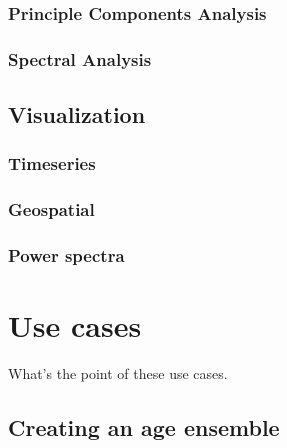 \documentclass[gc, manuscript]{copernicus}
\begin{document}
\subsubsection{Principle Components Analysis}

\subsubsection{Spectral Analysis}

\subsection{Visualization}

\subsubsection{Timeseries}

\subsubsection{Geospatial}

\subsubsection{Power spectra}

\section{Use cases}

What's the point of these use cases.

\subsection{Creating an age ensemble}
\end{document}
